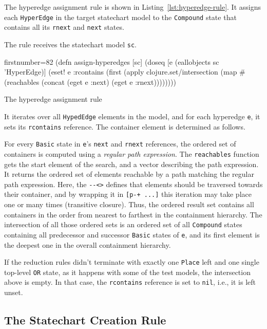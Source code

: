 \documentclass[11pt]{article}
\begin{document}
The hyperedge assignment rule is shown in Listing~\ref{lst:hyperedge-rule}.  It
assigns each \verb|HyperEdge| in the target statechart model to the
\verb|Compound| state that contains all its \verb|rnext| and \verb|next|
states.

The rule receives the statechart model \verb|sc|.

\begin{listing}[H]
  \begin{clojurecode*}{firstnumber=82}
(defn assign-hyperedges [sc]
  (doseq [e (eallobjects sc 'HyperEdge)]
    (eset! e :rcontains
           (first (apply clojure.set/intersection
                         (map #(reachables %
                              (concat (eget e :next) (eget e :rnext))))))))
  \end{clojurecode*}
  \label{lst:hyperedge-rule}
  \caption{The hyperedge assignment rule}
\end{listing}

It iterates over all \verb|HypedEdge| elements in the model, and for each
hyperedge \verb|e|, it sets its \verb|rcontains| reference.  The container
element is determined as follows.

For every \verb|Basic| state in \verb|e|'s \verb|next| and \verb|rnext|
references, the ordered set of containers is computed using a \emph{regular
  path expression}.  The \verb|reachables| function gets the start element of
the search, and a vector describing the path expression.  It returns the
ordered set of elements reachable by a path matching the regular path
expression.  Here, the \verb|--<>| defines that elements should be traversed
towards their container, and by wrapping it in \verb|[p-+ ...]| this iteration
may take place one or many times (transitive closure).  Thus, the ordered
result set contains all containers in the order from nearest to farthest in the
containment hierarchy.  The intersection of all those ordered sets is an
ordered set of all \verb|Compound| states containing all predecessor and
successor \verb|Basic| states of \verb|e|, and its first element is the deepest
one in the overall containment hierarchy.

If the reduction rules didn't terminate with exactly one \verb|Place| left and
one single top-level \verb|OR| state, as it happens with some of the test
models, the intersection above is empty.  In that case, the \verb|rcontains|
reference is set to \verb|nil|, i.e., it is left unset.

\subsection{The Statechart Creation Rule}
\label{sec:statechart-rule}
\end{document}
